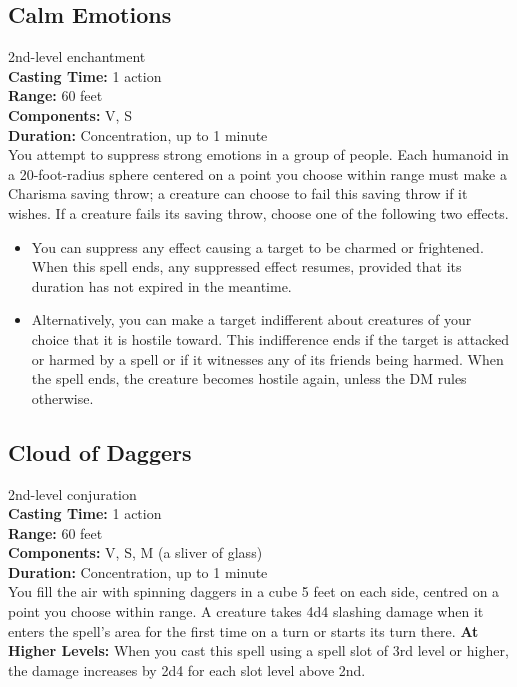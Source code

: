 \documentclass[11pt, A4paper, english]{article}
\begin{document}
		\subsection{Calm Emotions}
2nd-level enchantment \\
\textbf{Casting Time:} 1 action \\
\textbf{Range:} 60 feet \\
\textbf{Components:} V, S \\
\textbf{Duration:} Concentration, up to 1 minute \\
You attempt to suppress strong emotions in a group of people. Each humanoid in a 20-foot-radius sphere centered on a point you choose within range must make a Charisma saving throw; a creature can choose to fail this saving throw if it wishes. If a creature fails its saving throw, choose one of the following two effects.
			\begin{itemize}
\item You can suppress any effect causing a target to be charmed or frightened. When this spell ends, any suppressed effect resumes, provided that its duration has not expired in the meantime.
\item Alternatively, you can make a target indifferent about creatures of your choice that it is hostile toward. This indifference ends if the target is attacked or harmed by a spell or if it witnesses any of its friends being harmed. When the spell ends, the creature becomes hostile again, unless the DM rules otherwise.
			\end{itemize}

		\subsection{Cloud of Daggers}
2nd-level conjuration \\
\textbf{Casting Time:} 1 action \\
\textbf{Range:} 60 feet \\
\textbf{Components:} V, S, M (a sliver of glass) \\
\textbf{Duration:} Concentration, up to 1 minute \\
You fill the air with spinning daggers in a cube 5 feet on each side, centred on a point you choose within range. A creature takes 4d4 slashing damage when it enters the spell’s area for the first time on a turn or starts its turn there.
\textbf{At Higher Levels:} When you cast this spell using a spell slot of 3rd level or higher, the damage increases by 2d4 for each slot level above 2nd.
\end{document}
